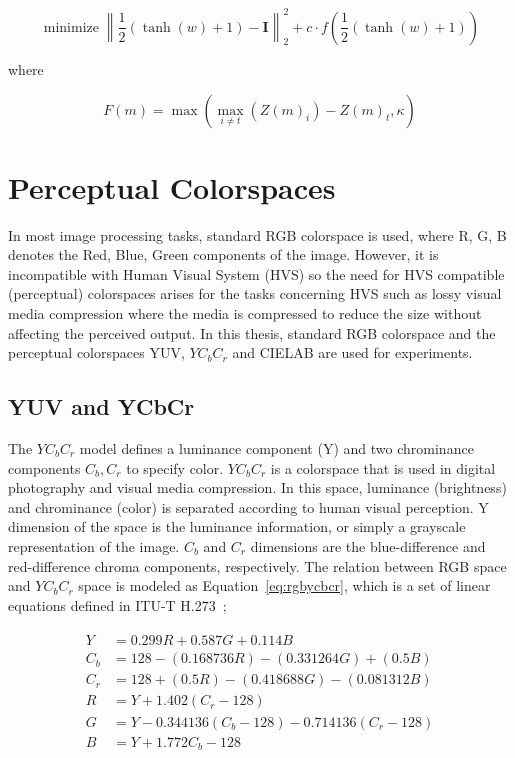 \begin{equation}
    \label{eq:cw}
    \operatorname{minimize}\left\|\frac{1}{2}(\tanh (w)+1)-\boldsymbol{I}\right\|_{2}^{2}+c \cdot f\left(\frac{1}{2}(\tanh (w)+1)\right)
\end{equation}

where

\begin{equation}
    \label{eq:cw2}
    F(m)=\max \left(\max _{i \neq t}\left(Z(m)_{i}\right)-Z(m)_{t}, \kappa\right)
\end{equation}



\section{Perceptual Colorspaces}
In most image processing tasks, standard RGB colorspace is used, where R, G, B denotes the Red, Blue, Green components of the image. However, it is incompatible with Human Visual System (HVS) so the need for HVS compatible (perceptual) colorspaces arises for the tasks concerning HVS such as lossy visual media compression where the media is compressed to reduce the size without affecting the perceived output. In this thesis, standard RGB colorspace and the perceptual colorspaces YUV, \(YC_{b}C_{r}\) and CIELAB are used for experiments.

\subsection{YUV and YCbCr}
The \(YC_{b}C_{r}\) model defines a luminance component (Y) and two chrominance components \(C_{b}, C_{r}\) to specify color. \(YC_{b}C_{r}\) is a colorspace that is used in digital photography and visual media compression. In this space, luminance (brightness) and chrominance (color) is separated according to human visual perception. Y dimension of the space is the luminance information, or simply a grayscale representation of the image. \(C_b\) and \(C_r\) dimensions are the blue-difference and red-difference chroma components, respectively. The relation between RGB space and \(YC_{b}C_{r}\) space is modeled as Equation~\ref*{eq:rgbycbcr}, which is a set of linear equations defined in ITU-T H.273~\cite{hamilton2004jpeg};

\begin{align}
    \label{eq:rgbycbcr}
    \begin{split}
        Y   & = 0.299 R+0.587 G+0.114 B                   \\
        C_b & = 128-(0.168736 R)-(0.331264 G)+(0.5 B)     \\
        C_r & = 128+(0.5 R)-(0.418688 G)-(0.081312 B)     \\
        R & = Y+1.402(C_{r}-128)                        \\
        G & = Y-0.344136(C_{b}-128)-0.714136(C_{r}-128) \\
        B & = Y+1.772C_b-128
    \end{split}
\end{align}

